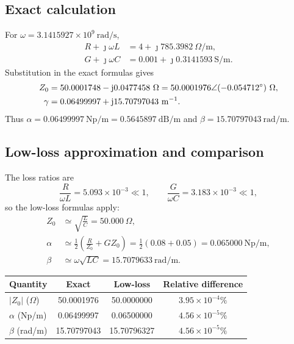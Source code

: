 \documentclass[12pt,a4paper]{article}
\begin{document}
\subsection{Exact calculation}

For $\omega=3.1415927\times10^9~\mathrm{rad/s}$,
\begin{align*}
R+\jmath\omega L&=4+\jmath785.3982~\Omega/\mathrm{m},\\
G+\jmath\omega C&=0.001+\jmath0.3141593~\mathrm{S/m}.
\end{align*}
Substitution in the exact formulas gives
\begin{align}
Z_0&=50.0001748-\mathrm{j}0.0477458~\Omega
    =50.0001976\angle(-0.054712^{\circ})~\Omega,\\
\gamma&=0.06499997+\mathrm{j}15.70797043~\mathrm{m}^{-1}.
\end{align}
Thus $\alpha=0.06499997~\mathrm{Np/m}=0.5645897~\mathrm{dB/m}$ and
$\beta=15.70797043~\mathrm{rad/m}$.

\subsection{Low-loss approximation and comparison}

The loss ratios are
\[
\frac{R}{\omega L}=5.093\times10^{-3}\ll1,
\qquad
\frac{G}{\omega C}=3.183\times10^{-3}\ll1,
\]
so the low-loss formulas apply:
\begin{align}
Z_0&\simeq\sqrt{\frac{L}{C}}=50.000~\Omega,\\
\alpha&\simeq\frac{1}{2}\left(\frac{R}{Z_0}+GZ_0\right)
=\frac{1}{2}(0.08+0.05)=0.065000~\mathrm{Np/m},\\
\beta&\simeq\omega\sqrt{LC}=15.7079633~\mathrm{rad/m}.
\end{align}

\begin{center}
\renewcommand{\arraystretch}{1.2}
\begin{tabular}{lccc}
\toprule
Quantity & Exact & Low-loss & Relative difference \\
\midrule
$|Z_0|$ ($\Omega$) & 50.0001976 & 50.0000000 & $3.95\times10^{-4}\%$ \\
$\alpha$ (Np/m) & 0.06499997 & 0.06500000 & $4.56\times10^{-5}\%$ \\
$\beta$ (rad/m) & 15.70797043 & 15.70796327 & $4.56\times10^{-5}\%$ \\
\bottomrule
\end{tabular}
\end{center}
\end{document}

